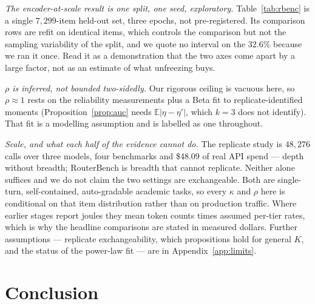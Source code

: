 \documentclass[10pt]{article}
\newcommand{\E}{\mathbb{E}}
\begin{document}
\emph{The encoder-at-scale result is one split, one seed, exploratory.}
Table~\ref{tab:rbenc} is a single $7{,}299$-item held-out set, three epochs, not
pre-registered. Its comparison rows are refit on identical items, which controls
the comparison but not the sampling variability of the split, and we quote no
interval on the $32.6\%$ because we ran it once. Read it as a demonstration that
the two axes come apart by a large factor, not as an estimate of what unfreezing
buys.

\emph{$\rho$ is inferred, not bounded two-sidedly.} Our rigorous ceiling is
vacuous here, so $\rho\approx1$ rests on the reliability measurements plus a
Beta fit to replicate-identified moments (Proposition~\ref{prop:auc} needs
$\E|\eta-\eta'|$, which $k=3$ does not identify). That fit is a modelling
assumption and is labelled as one throughout.

\emph{Scale, and what each half of the evidence cannot do.} The replicate study
is $48{,}276$ calls over three models, four benchmarks and \$48.09 of real API
spend --- depth without breadth; RouterBench is breadth that cannot replicate.
Neither alone suffices and we do not claim the two settings are exchangeable.
Both are single-turn, self-contained, auto-gradable academic tasks, so every
$\kappa$ and $\rho$ here is conditional on that item distribution rather than on
production traffic. Where earlier stages report joules they mean token counts
times assumed per-tier rates, which is why the headline comparisons are stated
in measured dollars. Further assumptions --- replicate exchangeability, which
propositions hold for general $K$, and the status of the power-law fit --- are in
Appendix~\ref{app:limits}.

\section{Conclusion}
\end{document}

